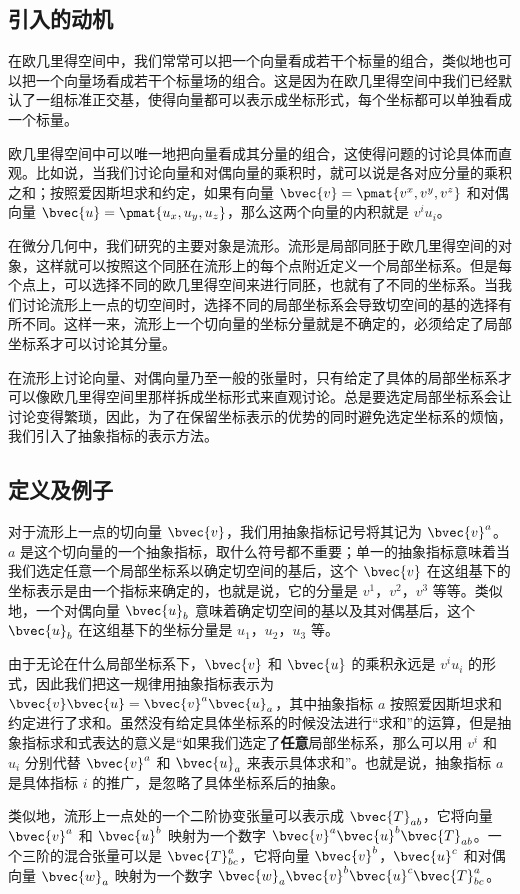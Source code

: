 

\begin{issues}
\issueMissDepend
\end{issues}

\subsection{引入的动机}
在欧几里得空间中，我们常常可以把一个向量看成若干个标量的组合，类似地也可以把一个向量场看成若干个标量场的组合。这是因为在欧几里得空间中我们已经默认了一组标准正交基，使得向量都可以表示成坐标形式，每个坐标都可以单独看成一个标量。

欧几里得空间中可以唯一地把向量看成其分量的组合，这使得问题的讨论具体而直观。比如说，当我们讨论向量和对偶向量的乘积时，就可以说是各对应分量的乘积之和；按照爱因斯坦求和约定，如果有向量 $\bvec{v}=\pmat{v^x, v^y, v^z}$ 和对偶向量 $\bvec{u}=\pmat{u_x, u_y, u_z}$，那么这两个向量的内积就是 $v^iu_i$。

在微分几何中，我们研究的主要对象是流形。流形是局部同胚于欧几里得空间的对象，这样就可以按照这个同胚在流形上的每个点附近定义一个局部坐标系。但是每个点上，可以选择不同的欧几里得空间来进行同胚，也就有了不同的坐标系。当我们讨论流形上一点的切空间时，选择不同的局部坐标系会导致切空间的基的选择有所不同。这样一来，流形上一个切向量的坐标分量就是不确定的，必须给定了局部坐标系才可以讨论其分量。

在流形上讨论向量、对偶向量乃至一般的张量时，只有给定了具体的局部坐标系才可以像欧几里得空间里那样拆成坐标形式来直观讨论。总是要选定局部坐标系会让讨论变得繁琐，因此，为了在保留坐标表示的优势的同时避免选定坐标系的烦恼，我们引入了抽象指标的表示方法。

\subsection{定义及例子}

对于流形上一点的切向量 $\bvec{v}$，我们用抽象指标记号将其记为 $\bvec{v}^a$。$a$ 是这个切向量的一个抽象指标，取什么符号都不重要；单一的抽象指标意味着当我们选定任意一个局部坐标系以确定切空间的基后，这个 $\bvec{v}$ 在这组基下的坐标表示是由一个指标来确定的，也就是说，它的分量是 $v^1$，$v^2$，$v^3$ 等等。类似地，一个对偶向量 $\bvec{u}_b$ 意味着确定切空间的基以及其对偶基后，这个 $\bvec{u}_b$ 在这组基下的坐标分量是 $u_1$，$u_2$，$u_3$ 等。

由于无论在什么局部坐标系下，$\bvec{v}$ 和 $\bvec{u}$ 的乘积永远是 $v^iu_i$ 的形式，因此我们把这一规律用抽象指标表示为 $\bvec{v}\bvec{u}=\bvec{v}^a\bvec{u}_a$，其中抽象指标 $a$ 按照爱因斯坦求和约定进行了求和。虽然没有给定具体坐标系的时候没法进行“求和”的运算，但是抽象指标求和式表达的意义是“如果我们选定了\textbf{任意}局部坐标系，那么可以用 $v^i$ 和 $u_i$ 分别代替 $\bvec{v}^a$ 和 $\bvec{u}_a$ 来表示具体求和”。也就是说，抽象指标 $a$ 是具体指标 $i$ 的推广，是忽略了具体坐标系后的抽象。

类似地，流形上一点处的一个二阶协变张量可以表示成 $\bvec{T}_{ab}$，它将向量 $\bvec{v}^a$ 和 $\bvec{u}^b$ 映射为一个数字 $\bvec{v}^a\bvec{u}^b\bvec{T}_{ab}$。一个三阶的混合张量可以是 $\bvec{T}^a_{bc}$，它将向量 $\bvec{v}^b$，$\bvec{u}^c$ 和对偶向量 $\bvec{w}_a$ 映射为一个数字 $\bvec{w}_a\bvec{v}^b\bvec{u}^c\bvec{T}_{bc}^a$。





